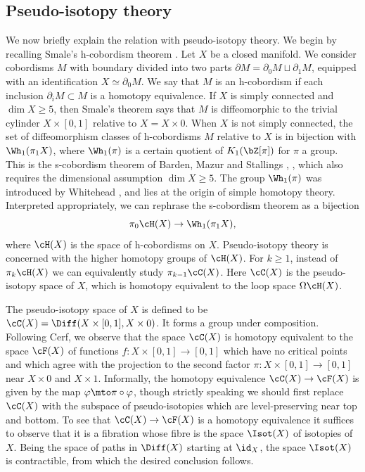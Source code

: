 \subsection{Pseudo-isotopy theory}

We now briefly explain the relation with pseudo-isotopy theory. We begin by recalling Smale's h-cobordism theorem \cite{S61}. Let $X$ be a closed manifold. We consider cobordisms $M$ with boundary divided into two parts $\partial M = \partial_0M \sqcup \partial_1M$, equipped with an identification $X \simeq \partial_0 M$. We say that $M$ is an h-cobordism if each inclusion $\partial_i M \subset M$ is a homotopy equivalence. If $X$ is simply connected and $\dim X \geq 5$, then Smale's theorem says that $M$ is diffeomorphic to the trivial cylinder $X \times [0,1]$ relative to $X=X \times 0 $. When $X$ is not simply connected, the set of diffeomorphism classes of h-cobordisms $M$ relative to $X$ is in bijection with $\Wh_1( \pi_1 X)$, where $\Wh_1(\pi)$ is a certain quotient of $K_1(\bZ[\pi])$ for $\pi$ a group. This is the s-cobordism theorem of Barden, Mazur and Stallings \cite{B64}, \cite{M63}, which also requires the dimensional assumption $\dim X \geq 5$. The group $\Wh_1(\pi)$ was introduced by Whitehead \cite{W50}, and lies at the origin of simple homotopy theory. Interpreted appropriately, we can rephrase the s-cobordism theorem as a bijection\vspace*{-3pt}
\[ \pi_0 \cH(X) \to \Wh_1( \pi_1 X), \]
where $\cH(X)$ is the space of h-cobordisms on $X$. Pseudo-isotopy theory is concerned with the higher homotopy groups of $\cH(X)$. For $k \geq 1$, instead of $\pi_k\cH(X)$ we can equivalently study $\pi_{k-1}\cC(X)$. Here $\cC(X)$ is the pseudo-isotopy space of $X$, which is homotopy equivalent to the loop space $\Omega \cH(X)$.

The pseudo-isotopy space of $X$ is defined to be $\cC(X)=\Diff(X \times [0,1], X \times 0)$. It forms a group under composition. Following Cerf, we observe that the space $\cC(X)$ is homotopy equivalent to the space $\cF(X)$ of functions $f: X \times [0,1] \to [0,1]$ which have no critical points and which agree with the projection to the second factor $\pi:X \times [0,1] \to [0,1]$ near $X \times 0$ and $X \times 1$. Informally, the homotopy equivalence $\cC(X) \to \cF(X)$ is given by the map $\varphi \mto \pi \circ \varphi$, though strictly speaking we should first replace $\cC(X)$ with the subspace of pseudo-isotopies which are level-preserving near top and bottom. To see that $\cC(X) \to \cF(X)$ is a homotopy equivalence it suffices to observe that it is a fibration whose fibre is the space $\Isot(X)$ of isotopies of $X$. Being the space of paths in $\Diff(X)$ starting at $\id_X$, the space $\Isot(X)$ is contractible, from which the desired conclusion follows.

